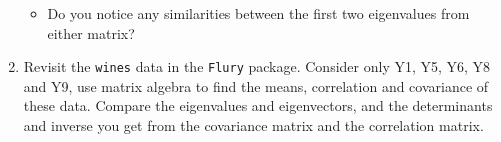 \documentclass{article}
\begin{document}
\begin{enumerate}
\begin{itemize}
%
%
%
%

\item Do you notice any similarities between the first two eigenvalues from either matrix?\\
\end{itemize}

\item Revisit the \texttt{wines} data in the \texttt{Flury} package.   Consider only Y1, Y5, Y6, Y8 and Y9, use matrix algebra to find the means, correlation and covariance of these data.   Compare the eigenvalues and eigenvectors, and the determinants and inverse you get from the covariance matrix and the correlation matrix.\\

%
%
%

\end{enumerate} 
\end{document}
